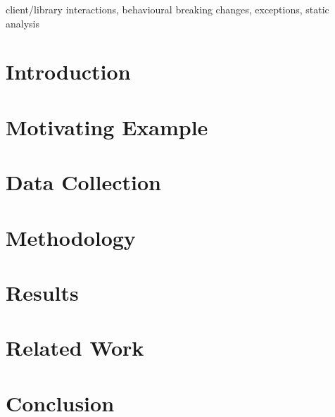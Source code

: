 \documentclass[conference]{IEEEtran}
\begin{document}
    

    \begin{IEEEkeywords}
        client/library interactions, behavioural breaking changes, exceptions, static analysis
    \end{IEEEkeywords}


    \section{Introduction} \label{sec:introduction}
    

    \section{Motivating Example} \label{sec:motivating}
    



    \section{Data Collection}\label{sec:data-collection}
    


    \section{Methodology}\label{sec:methodology}
    


    \section{Results}\label{sec:results}
    



    
    \section{Related Work}\label{sec:related-work}
    
    

    \section{Conclusion}\label{sec:conclusion-&-future-work}
    
    
    
\end{document}
